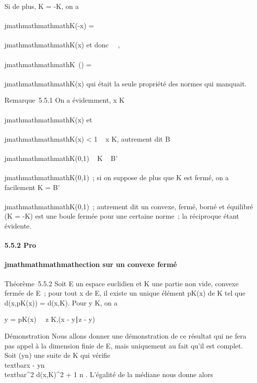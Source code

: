Si de plus, K = -K, on a \\\\jmathmathmathmathK(-x) = \\\\jmathmathmathmathK(x) et donc
\forall~\mu \in {}~, \\\\jmathmathmathmathK~(\mux) =
\textbar{}\mu\textbar{}\\\\jmathmathmathmathK(x) qui était la seule propriété des
normes qui manquait.

Remarque~5.5.1 On a évidemment, x \in K \rigtharrow~ \\\\jmathmathmathmathK(x)  et
\\\\jmathmathmathmathK(x) \textless{} 1 \rigtharrow~ x \in K, autrement dit
B\\\\jmathmathmathmathK(0,1) \subset~ K \subset~ B'\\\\jmathmathmathmathK(0,1)~; si on
suppose de plus que K est fermé, on a facilement K =
B'\\\\jmathmathmathmathK(0,1)~; autrement dit un convexe, fermé, borné
et équilibré (K = -K) est une boule fermée pour une certaine norme~; la
réciproque étant évidente.

\paragraph{5.5.2 Pro\\\\jmathmathmathmathection sur un convexe fermé}

Théorème~5.5.2 Soit E un espace euclidien et K une partie non vide,
convexe fermée de E~; pour tout x de E, il existe un unique élément
pK(x) de K tel que d(x,pK(x)) = d(x,K). Pour y \in K,
on a

y = pK(x) \Leftrightarrow
\forall~~z \in K,\quad (x -
y∣z - y) 

Démonstration Nous allons donner une démonstration de ce résultat qui ne
fera pas appel à la dimension finie de E, mais uniquement au fait qu'il
est complet. Soit (yn) une suite de K qui vérifie
\\textbar{}x -
yn\\textbar{}^2 \leq
d(x,K)^2 + 1 \over n . L'égalité de la
médiane nous donne alors

